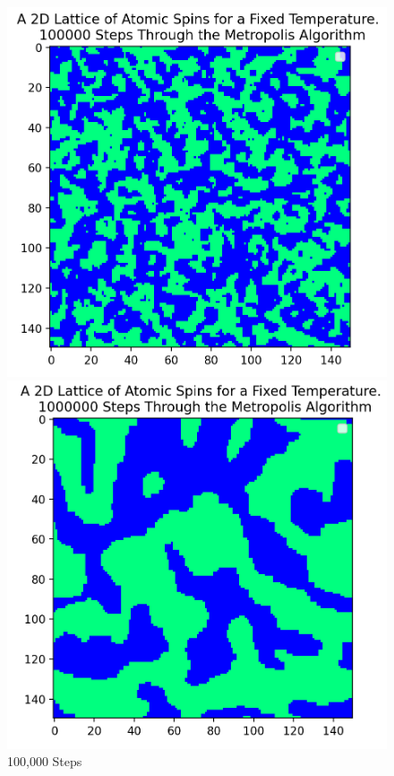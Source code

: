 \documentclass[a4paper]{article}
\begin{document}
\begin{figure}[!htb]
  \includegraphics[width=\linewidth]{100,000 steps.png}
  \caption{100,000 Steps}\label{fig:10steps}
\endminipage\hfill
{}
  \includegraphics[width=\linewidth]{1,000,000 steps.png}

\end{figure}
\end{document}
